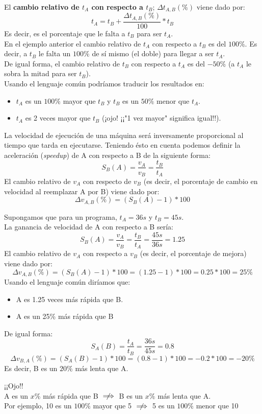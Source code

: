 \documentclass[12pt,spanish]{article}
\begin{document}
El \textbf{cambio relativo de $t_A$ con respecto a $t_B$}; $\Delta t_{A,B}(\%)$ viene dado por:
\[
t_A=t_B + \frac{\Delta t_{A,B}(\%)}{100} * t_B
\]
Es decir, es el porcentaje que le falta a $t_B$ para ser $t_A$.\\
En el ejemplo anterior el cambio relativo de $t_A$ con respecto a $t_B$ es del $100\%$. Es decir, a $t_B$ le falta un $100\%$ de sí mismo (el doble) para llegar a ser $t_A$.\\
De igual forma, el cambio relativo de $t_B$ con respecto a $t_A$ es del $-50\%$ (a $t_A$ le sobra la mitad para ser $t_B$).\\
Usando el lenguaje común podríamos traducir los resultados en:
\begin{itemize}
	\item $t_A$ es un $100\%$ mayor que $t_B$ y $t_B$ es un $50\%$ menor que $t_A$.
	\item $t_A$ es 2 veces mayor que $t_B$ (¡ojo! ¡¡"1 vez mayor" significa igual!!).
\end{itemize}

La velocidad de ejecución de una máquina será inversamente proporcional al tiempo que tarda en ejecutarse. Teniendo ésto en cuenta podemos definir la aceleración (\textit{speedup}) de A con respecto a B de la siguiente forma:
\[
S_B(A)=\frac{v_A}{v_B}=\frac{t_B}{t_A}
\]
El cambio relativo de $v_A$ con respecto de $v_B$ (es decir, el porcentaje de cambio en velocidad al reemplazar A por B) viene dado por:
\[
\Delta v_{A,B}(\%)=(S_B(A) -1) * 100
\]

Supongamos que para un programa, $t_A=36s$ y $t_B=45s$.\\
La ganancia de velocidad de A con respecto a B sería:
\[
S_B(A)=\frac{v_A}{v_B}=\frac{t_B}{t_A}=\frac{45 s}{36 s}=1.25
\]
El cambio relativo de $v_A$ con respecto a $v_B$ (es decir, el porcentaje de mejora) viene dado por:
\[
\Delta v_{A,B}(\%)=(S_B(A)-1) * 100 = (1.25 - 1) * 100 = 0.25 * 100 = 25\%
\]
Usando el lenguaje común diríamos que:
\begin{itemize}
	\item A es 1.25 veces más rápida que B.
	\item A es un 25\% más rápida que B
\end{itemize}
De igual forma:
\[
S_A(B)=\frac{t_A}{t_B}=\frac{36 s}{45 s}=0.8
\]
\[
\Delta v_{B,A}(\%)=(S_A(B)-1) * 100 = (0.8 - 1) * 100 = -0.2 * 100 = -20\%
\]
Es decir, B es un $20\%$ más lenta que A.

\begin{center}
	¡¡Ojo!! \\
	A es un $x\%$ más rápida que B $\centernot\implies$ B es un $x\%$ más lenta que A.\\
	Por ejemplo, 10 es un $100\%$ mayor que 5 $\centernot\implies$ 5 es un $100\%$ menor que 10
\end{center}
\end{document}
